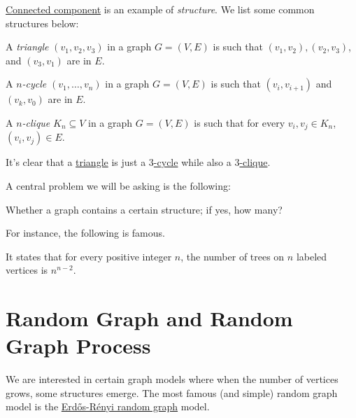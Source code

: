\hyperref[def:connected-component]{Connected component} is an example of \emph{structure}. We list some common structures below:

\begin{definition}[Triangle]\label{def:triangle}
	A \emph{triangle} \((v_1, v_2, v_3)\) in a graph \(G = (V, E)\) is such that \((v_1, v_2), (v_2, v_3)\), and \((v_3, v_1)\) are in \(E\).
\end{definition}

\begin{definition}[Cycle]\label{def:cycle}
	A \emph{\(n\)-cycle} \((v_1, \dots , v_n)\) in a graph \(G = (V, E)\) is such that \((v_i, v_{i+1})\) and \((v_k, v_0)\) are in \(E\).
\end{definition}

\begin{definition}[Clique]\label{def:clique}
	A \emph{\(n\)-clique} \(K_n \subseteq V\) in a graph \(G = (V, E)\) is such that for every \(v_i, v_j \in K_n\), \((v_i, v_j) \in E\).
\end{definition}

\begin{eg}
	It's clear that a \hyperref[def:triangle]{triangle} is just a \hyperref[def:cycle]{\(3\)-cycle} while also a \hyperref[def:clique]{\(3\)-clique}.
\end{eg}

A central problem we will be asking is the following:

\begin{problem*}
	Whether a graph contains a certain structure; if yes, how many?
\end{problem*}

For instance, the following is famous.

\begin{theorem}\label{thm:Cayley-formula}
	It states that for every positive integer \(n\), the number of trees on \(n\) labeled vertices is \(n^{n-2}\).
\end{theorem}

\section{Random Graph and Random Graph Process}
We are interested in certain graph models where when the number of vertices grows, some structures emerge. The most famous (and simple) random graph model is the \hyperref[def:Erdős-Rényi-random-graph]{Erdős-Rényi random graph} model.

